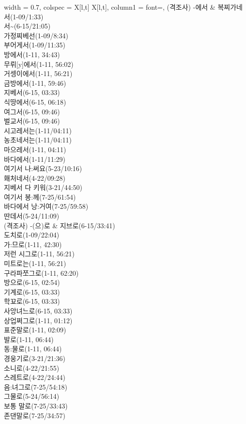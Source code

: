 \begin{longtblr}{
    width = 0.7\textwidth,
    colspec = {X[l,t] X[l,t]},
    column{1} = {font=\sffamily\bfseries},
  }
  (격조사) -에서 & {복찌가네서(1-09/1:33) \\ 서\textasciitilde{}(6-15/21:05) \\ 가정찌베선(1-09/8:34) \\ 부어게서(1-09/11:35) \\ 방에서(1-11, 34:43) \\ 무뤼[y]에서(1-11, 56:02) \\ 거셍이에서(1-11, 56:21) \\ 금방에서(1-11,   59:46) \\ 지베서(6-15, 03:33) \\ 식땅에서(6-15, 06:18) \\ 여그서(6-15, 09:46) \\ 벌교서(6-15,   09:46) \\ 시고레서는(1-11/04:11) \\ 농초네서는(1-11/04:11) \\ 마으레서(1-11, 04:11) \\ 바다에서(1-11/11:29) \\ 여기서 나:써요(5-23/10:16) \\ 홰처네서(4-22/09:28) \\ 지베서 다 키워(3-21/44:50) \\ 여기서 봉:께(7-25/61:54) \\ 바다에서 낭:거여(7-25/59:58) \\ 딴데서(5-24/11:09)} \\
  (격조사) -(으)로 & {지브로(6-15/33:41) \\ 도치로(1-09/22:04) \\ 가:므로(1-11, 42:30) \\ 저런 시그로(1-11, 56:21) \\ 미트로는(1-11, 56:21) \\ 구라파쪼그로(1-11, 62:20) \\ 방으로(6-15, 02:54) \\ 기계로(6-15, 03:33) \\ 학꾜로(6-15, 03:33) \\ 사앙녀느로(6-15, 03:33) \\ 상업쩌그로(1-11, 01:12) \\ 표준말로(1-11, 02:09) \\ 발로(1-11, 06:44) \\ 동:물로(1-11, 06:44) \\ 경웅기로(3-21/21:36) \\ 소니로(4-22/21:55) \\ 스레트로(4-22/24:44) \\ 음:녀그로(7-25/54:18) \\ 그물로(5-24/56:14) \\ 보통 말로(7-25/33:43) \\ 존댄말로(7-25/34:57)} \\

\end{longtblr}
